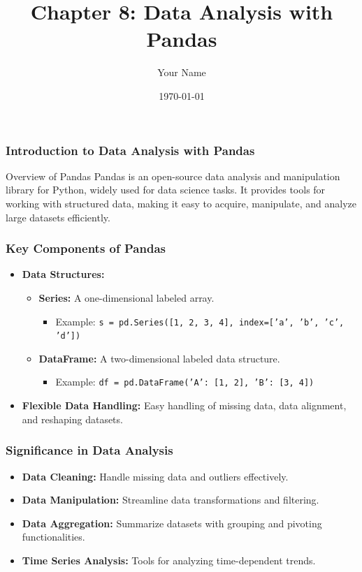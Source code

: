 \documentclass{beamer}
\title{Chapter 8: Data Analysis with Pandas}
\author{Your Name}
\institute{Your Institution}
\date{\today}
\begin{document}
\frame{\titlepage}

\begin{frame}[fragile]
    \frametitle{Introduction to Data Analysis with Pandas}
    \begin{block}{Overview of Pandas}
        Pandas is an open-source data analysis and manipulation library for Python, widely used for data science tasks. It provides tools for working with structured data, making it easy to acquire, manipulate, and analyze large datasets efficiently.
    \end{block}
\end{frame}

\begin{frame}[fragile]
    \frametitle{Key Components of Pandas}
    \begin{itemize}
        \item \textbf{Data Structures:}
        \begin{itemize}
            \item \textbf{Series:} A one-dimensional labeled array.
                \begin{itemize}
                    \item Example: \texttt{s = pd.Series([1, 2, 3, 4], index=['a', 'b', 'c', 'd'])}
                \end{itemize}
            \item \textbf{DataFrame:} A two-dimensional labeled data structure.
                \begin{itemize}
                    \item Example: \texttt{df = pd.DataFrame({'A': [1, 2], 'B': [3, 4]})}
                \end{itemize}
        \end{itemize}
        \item \textbf{Flexible Data Handling:} Easy handling of missing data, data alignment, and reshaping datasets.
    \end{itemize}
\end{frame}

\begin{frame}[fragile]
    \frametitle{Significance in Data Analysis}
    \begin{itemize}
        \item \textbf{Data Cleaning:} Handle missing data and outliers effectively.
        \item \textbf{Data Manipulation:} Streamline data transformations and filtering.
        \item \textbf{Data Aggregation:} Summarize datasets with grouping and pivoting functionalities.
        \item \textbf{Time Series Analysis:} Tools for analyzing time-dependent trends.
    \end{itemize}
\end{frame}
\end{document}

